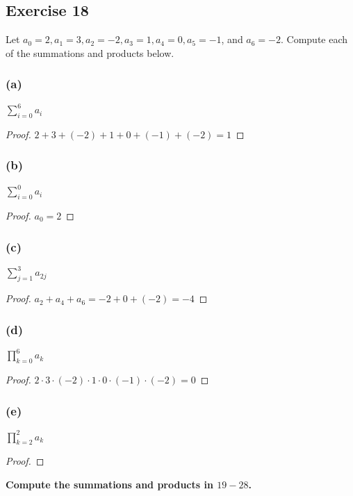 \documentclass[14pt]{extarticle}
\newcommand{\dps}{\displaystyle}
\newcommand{\cy}{\color{cyan}}
\begin{document}
\subsection{Exercise 18}
Let $a_0 = 2, a_1 = 3, a_2 = -2, a_3 = 1, a_4 = 0, a_5 = -1$, and $a_6 = -2$. Compute each of the summations and products below.

\subsubsection{(a)}
$\dps\sum_{i=0}^{6}a_i$

\begin{proof}
    $2 + 3 + (-2) + 1 + 0 + (-1) + (-2) = 1$

\end{proof}

\subsubsection{(b)}
$\dps\sum_{i=0}^{0}a_i$

\begin{proof}
    $a_0 = 2$
\end{proof}

\subsubsection{(c)}
$\dps\sum_{j=1}^{3}a_{2j}$

\begin{proof}
    $a_2 + a_4 + a_6 = -2 + 0 + (-2) = -4$
\end{proof}

\subsubsection{(d)}
$\dps\prod_{k=0}^{6}a_k$

\begin{proof}
    $2 \cdot 3 \cdot (-2) \cdot 1 \cdot 0 \cdot (-1) \cdot (-2) = 0$
\end{proof}

\subsubsection{(e)}
$\dps\prod_{k=2}^{2}a_k$

\begin{proof}

\end{proof}

{\bf\cy Compute the summations and products in $19-28$.}
\end{document}
